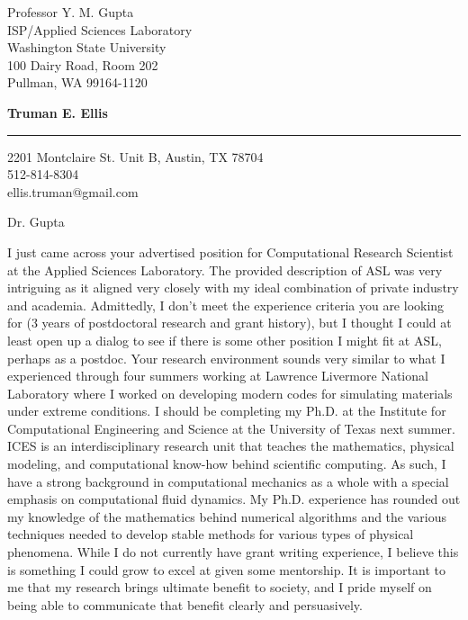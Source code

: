 \documentclass{letter} %
\begin{document}
\signature{Truman E. Ellis}           %
\longindentation=0pt                       %
\let\raggedleft\raggedright                %
 
 
\begin{letter}{
Professor Y. M. Gupta\\
ISP/Applied Sciences Laboratory\\
Washington State University\\
100 Dairy Road, Room 202\\
Pullman, WA 99164-1120\\
}

\begin{flushleft}
{\large\bf Truman E. Ellis}
\end{flushleft}
\medskip\hrule height 1pt
\begin{flushright}
\hfill 2201 Montclaire St. Unit B, Austin, TX 78704 \\
\hfill 512-814-8304\\
\hfill ellis.truman@gmail.com
\end{flushright} 
\vfill %

 
\opening{Dr. Gupta} 
 
\noindent I just came across your advertised position for Computational Research Scientist at the Applied Sciences Laboratory.
The provided description of ASL was very intriguing as it aligned very closely with my ideal combination of private industry and academia.
Admittedly, I don't meet the experience criteria you are looking for (3 years of postdoctoral research and grant history), but I thought I could at least
open up a dialog to see if there is some other position I might fit at ASL, perhaps as a postdoc.
Your research environment sounds very similar to what I experienced through four summers working at Lawrence Livermore National Laboratory
where I worked on developing modern codes for simulating materials under extreme conditions.
I should be completing my Ph.D. at the Institute for Computational Engineering and Science at the University of Texas next summer.
ICES is an interdisciplinary research unit that teaches the mathematics, physical modeling, and computational know-how behind scientific computing.
As such, I have a strong background in computational mechanics as a whole with a special emphasis on computational fluid dynamics.
My Ph.D. experience has rounded out my knowledge of the mathematics behind numerical algorithms and the various techniques needed to develop
stable methods for various types of physical phenomena.
While I do not currently have grant writing experience, I believe this is something I could grow to excel at given some mentorship.
It is important to me that my research brings ultimate benefit to society, and I pride myself on being able to communicate 
that benefit clearly and persuasively.


\end{letter}
\end{document}
